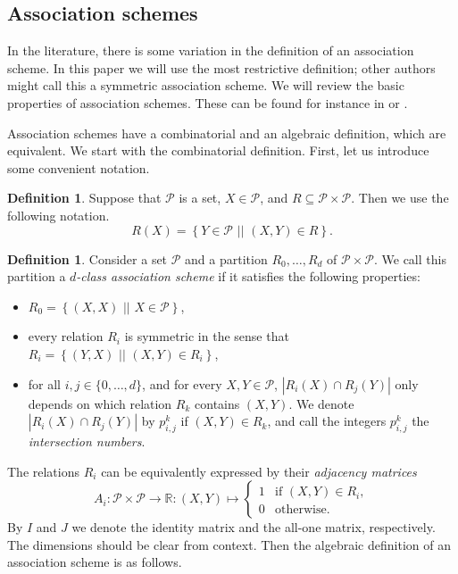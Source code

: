\documentclass[a4paper]{article}
\theoremstyle{definition}
\newtheorem{df}[thm]{Definition}
\newcommand{\RR}{\mathbb R}
\newcommand{\sett}[2]{ \left\{ #1 \, \, || \, \, #2 \right \} }
\newcommand{\pp}{\mathcal P}
\begin{document}
\subsection{Association schemes}
 \label{SubSec:Assoc}

In the literature, there is some variation in the definition of an association scheme.
In this paper we will use the most restrictive definition; other authors might call this a symmetric association scheme.
We will review the basic properties of association schemes.
These can be found for instance in %
\cite[\S\S 2.1-2.2]{bcn} or \cite[\S 3]{godsilmeagher}.

Association schemes have a combinatorial and an algebraic definition, which are equivalent.
We start with the combinatorial definition.
First, let us introduce some convenient notation.

\begin{df}
 Suppose that $\pp$ is a set, $X \in \pp$, and $R \subseteq \pp \times \pp$.
 Then we use the following notation.
 \[
  R(X) = \sett{Y \in \pp}{(X,Y) \in R}.
 \]
\end{df}

\begin{df}
 Consider a set $\pp$ and a partition $R_0, \ldots, R_d$ of $\pp \times \pp$.
 We call this partition a \emph{$d$-class association scheme} if it satisfies the following properties:
 \begin{itemize}
  \item $R_0 = \sett{(X,X)}{X \in \pp}$,
  \item every relation $R_i$ is symmetric in the sense that $R_i = \sett{(Y,X)}{(X,Y) \in R_i}$,
  \item for all $i, j \in \{0,\ldots,d\}$, and for every $X,Y \in \pp$, $|R_i(X) \cap R_j(Y)|$ only depends on which relation $R_k$ contains $(X,Y)$.
  We denote $|R_i(X) \cap R_j(Y)|$ by $p^k_{i,j}$ if $(X,Y) \in R_k$, and call the integers $p^k_{i,j}$ the \emph{intersection numbers}.
 \end{itemize}
\end{df}

The relations $R_i$ can be equivalently expressed by their \emph{adjacency matrices}
\[
 A_i: \pp \times \pp \to \RR: (X,Y) \mapsto \begin{cases}
  1 & \text{if } (X,Y) \in R_i, \\
  0 & \text{otherwise.}
 \end{cases}
\]
By $I$ and $J$ we denote the identity matrix and the all-one matrix, respectively.
The dimensions should be clear from context.
Then the algebraic definition of an association scheme is as follows.
\end{document}
